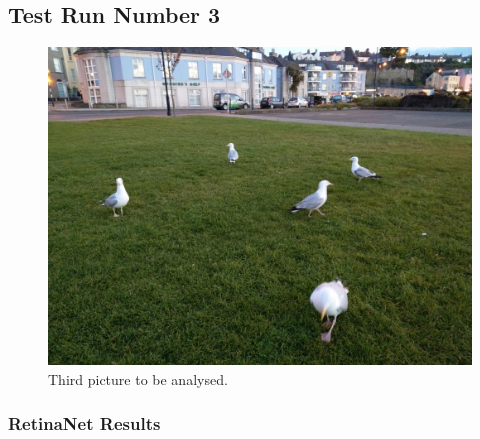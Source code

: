     \newpage


    \subsection{Test Run Number 3}

    \begin{figure}[htb]
        \centering
        \includegraphics[scale = 0.20]{Sections/4InitialWork/4_images_obj_run3/photo.jpg}
        \caption{Third picture to be analysed.} 
    \end{figure}

    \subsubsection{RetinaNet Results}

